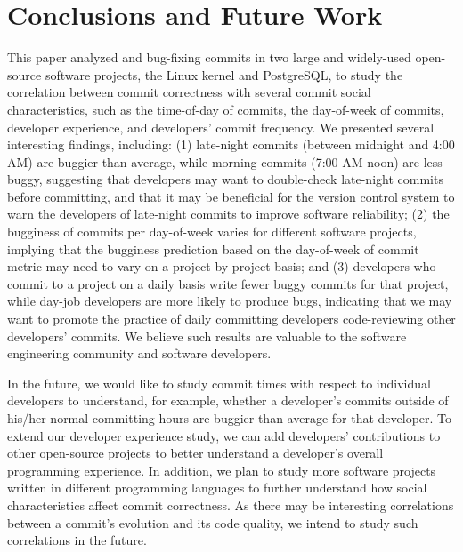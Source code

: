 \section{Conclusions and Future Work}
\label{sec-conclusion}

This paper analyzed \linuxBFC and \postBFC bug-fixing commits in two large and
widely-used open-source software projects, the Linux kernel and PostgreSQL, 
to study the correlation between commit correctness with several
commit social characteristics, such as the time-of-day of commits, the
day-of-week of commits, developer experience, and developers' commit 
frequency. We presented several interesting findings, including: (1) late-night
commits (between midnight and 4:00 AM) are buggier than average, while morning
commits (7:00 AM-noon) are less buggy, suggesting that developers may want to
double-check late-night commits before committing, and that it may be beneficial
for the version control system to warn the developers of late-night commits to
improve software reliability; (2) the bugginess of commits
per day-of-week varies for different software projects, implying that the
bugginess prediction based on the day-of-week of commit metric may need to vary
on a project-by-project basis; and (3) developers who commit to a project on a
daily basis write fewer buggy commits for that project, while day-job developers
are more likely to produce bugs, indicating that we may want to promote the
practice of daily committing developers code-reviewing other developers'
commits. We believe such results are valuable to the software engineering
community and software developers.

In the future, we would like to study commit times with respect to individual
developers to understand, for example, whether a developer's commits outside of
his/her normal committing hours are buggier than average for that developer. To
extend our developer experience study, we can add developers' contributions to
other open-source projects to better understand a developer's overall
programming experience. In addition, we plan to study more software projects
written in different programming languages to further understand how social
characteristics affect commit correctness. As there may be interesting
correlations between a commit's evolution and its code quality, we intend to
study such correlations in the future.



